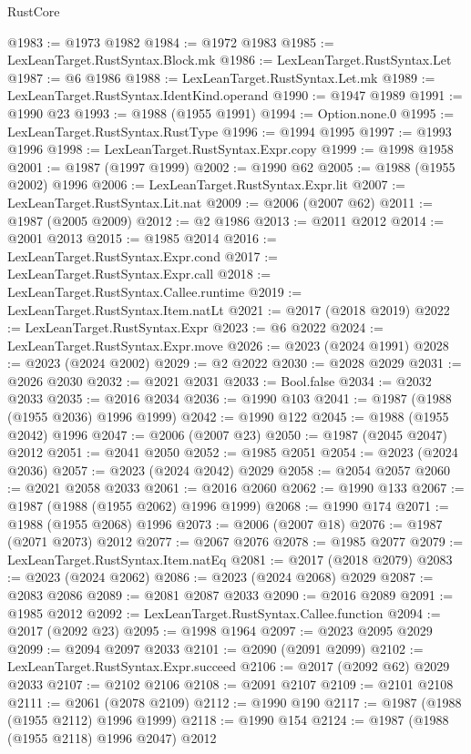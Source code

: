\begin{lexlean}{RustCore}
\begin{coremodule}
@1983 := @1973 @1982
@1984 := @1972 @1983
@1985 := LexLeanTarget.RustSyntax.Block.mk
@1986 := LexLeanTarget.RustSyntax.Let
@1987 := @6 @1986
@1988 := LexLeanTarget.RustSyntax.Let.mk
@1989 := LexLeanTarget.RustSyntax.IdentKind.operand
@1990 := @1947 @1989
@1991 := @1990 @23
@1993 := @1988 (@1955 @1991)
@1994 := Option.none.{0}
@1995 := LexLeanTarget.RustSyntax.RustType
@1996 := @1994 @1995
@1997 := @1993 @1996
@1998 := LexLeanTarget.RustSyntax.Expr.copy
@1999 := @1998 @1958
@2001 := @1987 (@1997 @1999)
@2002 := @1990 @62
@2005 := @1988 (@1955 @2002) @1996
@2006 := LexLeanTarget.RustSyntax.Expr.lit
@2007 := LexLeanTarget.RustSyntax.Lit.nat
@2009 := @2006 (@2007 @62)
@2011 := @1987 (@2005 @2009)
@2012 := @2 @1986
@2013 := @2011 @2012
@2014 := @2001 @2013
@2015 := @1985 @2014
@2016 := LexLeanTarget.RustSyntax.Expr.cond
@2017 := LexLeanTarget.RustSyntax.Expr.call
@2018 := LexLeanTarget.RustSyntax.Callee.runtime
@2019 := LexLeanTarget.RustSyntax.Item.natLt
@2021 := @2017 (@2018 @2019)
@2022 := LexLeanTarget.RustSyntax.Expr
@2023 := @6 @2022
@2024 := LexLeanTarget.RustSyntax.Expr.move
@2026 := @2023 (@2024 @1991)
@2028 := @2023 (@2024 @2002)
@2029 := @2 @2022
@2030 := @2028 @2029
@2031 := @2026 @2030
@2032 := @2021 @2031
@2033 := Bool.false
@2034 := @2032 @2033
@2035 := @2016 @2034
@2036 := @1990 @103
@2041 := @1987 (@1988 (@1955 @2036) @1996 @1999)
@2042 := @1990 @122
@2045 := @1988 (@1955 @2042) @1996
@2047 := @2006 (@2007 @23)
@2050 := @1987 (@2045 @2047) @2012
@2051 := @2041 @2050
@2052 := @1985 @2051
@2054 := @2023 (@2024 @2036)
@2057 := @2023 (@2024 @2042) @2029
@2058 := @2054 @2057
@2060 := @2021 @2058 @2033
@2061 := @2016 @2060
@2062 := @1990 @133
@2067 := @1987 (@1988 (@1955 @2062) @1996 @1999)
@2068 := @1990 @174
@2071 := @1988 (@1955 @2068) @1996
@2073 := @2006 (@2007 @18)
@2076 := @1987 (@2071 @2073) @2012
@2077 := @2067 @2076
@2078 := @1985 @2077
@2079 := LexLeanTarget.RustSyntax.Item.natEq
@2081 := @2017 (@2018 @2079)
@2083 := @2023 (@2024 @2062)
@2086 := @2023 (@2024 @2068) @2029
@2087 := @2083 @2086
@2089 := @2081 @2087 @2033
@2090 := @2016 @2089
@2091 := @1985 @2012
@2092 := LexLeanTarget.RustSyntax.Callee.function
@2094 := @2017 (@2092 @23)
@2095 := @1998 @1964
@2097 := @2023 @2095 @2029
@2099 := @2094 @2097 @2033
@2101 := @2090 (@2091 @2099)
@2102 := LexLeanTarget.RustSyntax.Expr.succeed
@2106 := @2017 (@2092 @62) @2029 @2033
@2107 := @2102 @2106
@2108 := @2091 @2107
@2109 := @2101 @2108
@2111 := @2061 (@2078 @2109)
@2112 := @1990 @190
@2117 := @1987 (@1988 (@1955 @2112) @1996 @1999)
@2118 := @1990 @154
@2124 := @1987 (@1988 (@1955 @2118) @1996 @2047) @2012

\end{coremodule}
\end{lexlean}
